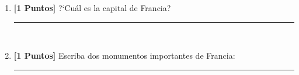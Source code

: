 \documentclass{article}
\begin{document}
\begin{enumerate}
\item{\bf [1 Puntos]} ?`Cu\'al es la capital de Francia? \rule{94mm}{0.1mm}\\
\item{\bf [1 Puntos]} Escriba dos monumentos importantes de Francia: \rule{68mm}{0.1mm}
\end{enumerate}
\end{document}
